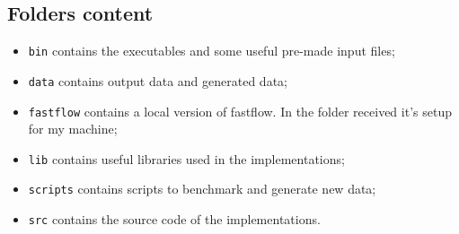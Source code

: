 \documentclass[12pt, letterpaper]{article}  %
\begin{document}
\subsection{Folders content}
\begin{itemize}
    \item \texttt{bin} contains the executables and some useful pre-made input files;
    \item \texttt{data} contains output data and generated data;
    \item \texttt{fastflow} contains a local version of fastflow. In the folder received it's setup for my machine;
    \item \texttt{lib} contains useful libraries used in the implementations;
    \item \texttt{scripts} contains scripts to benchmark and generate new data;
    \item \texttt{src} contains the source code of the implementations.
\end{itemize}
\end{document}
